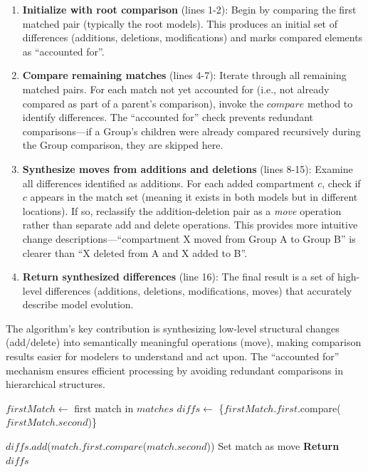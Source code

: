 \begin{enumerate}
    \item \textbf{Initialize with root comparison} (lines 1-2): Begin by comparing the first matched pair (typically the root models). This produces an initial set of differences (additions, deletions, modifications) and marks compared elements as ``accounted for''.

    \item \textbf{Compare remaining matches} (lines 4-7): Iterate through all remaining matched pairs. For each match not yet accounted for (i.e., not already compared as part of a parent's comparison), invoke the $compare$ method to identify differences. The ``accounted for'' check prevents redundant comparisons---if a Group's children were already compared recursively during the Group comparison, they are skipped here.

    \item \textbf{Synthesize moves from additions and deletions} (lines 8-15): Examine all differences identified as additions. For each added compartment $c$, check if $c$ appears in the match set (meaning it exists in both models but in different locations). If so, reclassify the addition-deletion pair as a \textit{move} operation rather than separate add and delete operations. This provides more intuitive change descriptions---``compartment X moved from Group A to Group B'' is clearer than ``X deleted from A and X added to B''.

    \item \textbf{Return synthesized differences} (line 16): The final result is a set of high-level differences (additions, deletions, modifications, moves) that accurately describe model evolution.
\end{enumerate}

The algorithm's key contribution is synthesizing low-level structural changes (add/delete) into semantically meaningful operations (move), making comparison results easier for modelers to understand and act upon. The ``accounted for'' mechanism ensures efficient processing by avoiding redundant comparisons in hierarchical structures.


\begin{algorithm}[th]
\caption{Differencing}
\label{alg:differencing}
\begin{algorithmic}
\State $firstMatch \gets$ first match in $matches$
\State $diffs \gets$ \{$firstMatch.first$.compare($firstMatch.second$)\}

        \State $diffs$.$add$($match.first$.$compare$($match.second$))
    \EndIf
\EndFor
{}
            \State Set match as move
        \EndIf
    \EndFor
\EndFor
\State \textbf{Return} $diffs$
\end{algorithmic}
\end{algorithm}



